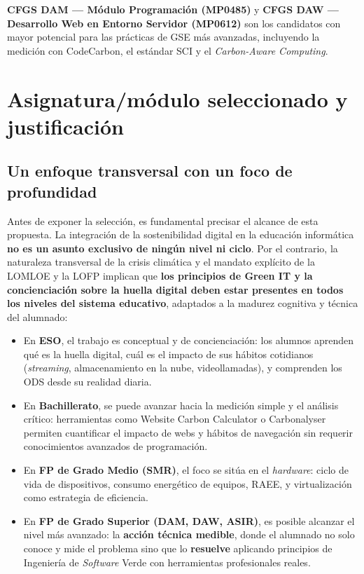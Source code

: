 \textbf{CFGS DAM — Módulo Programación (MP0485)} y \textbf{CFGS DAW — Desarrollo Web en Entorno Servidor (MP0612)} son los candidatos con mayor potencial para las prácticas de GSE más avanzadas, incluyendo la medición con CodeCarbon, el estándar SCI y el \textit{Carbon-Aware Computing}.




\section{Asignatura/módulo seleccionado y justificación}


\subsection{Un enfoque transversal con un foco de profundidad}


Antes de exponer la selección, es fundamental precisar el alcance de esta propuesta. La integración de la sostenibilidad digital en la educación informática \textbf{no es un asunto exclusivo de ningún nivel ni ciclo}. Por el contrario, la naturaleza transversal de la crisis climática y el mandato explícito de la LOMLOE y la LOFP implican que \textbf{los principios de Green IT y la concienciación sobre la huella digital deben estar presentes en todos los niveles del sistema educativo}, adaptados a la madurez cognitiva y técnica del alumnado:


\begin{itemize}
\item En \textbf{ESO}, el trabajo es conceptual y de concienciación: los alumnos aprenden qué es la huella digital, cuál es el impacto de sus hábitos cotidianos (\textit{streaming}, almacenamiento en la nube, videollamadas), y comprenden los ODS desde su realidad diaria.
\item En \textbf{Bachillerato}, se puede avanzar hacia la medición simple y el análisis crítico: herramientas como Website Carbon Calculator o Carbonalyser permiten cuantificar el impacto de webs y hábitos de navegación sin requerir conocimientos avanzados de programación.
\item En \textbf{FP de Grado Medio (SMR)}, el foco se sitúa en el \textit{hardware}: ciclo de vida de dispositivos, consumo energético de equipos, RAEE, y virtualización como estrategia de eficiencia.
\item En \textbf{FP de Grado Superior (DAM, DAW, ASIR)}, es posible alcanzar el nivel más avanzado: la \textbf{acción técnica medible}, donde el alumnado no solo conoce y mide el problema sino que lo \textbf{resuelve} aplicando principios de Ingeniería de \textit{Software} Verde con herramientas profesionales reales.
\end{itemize}


